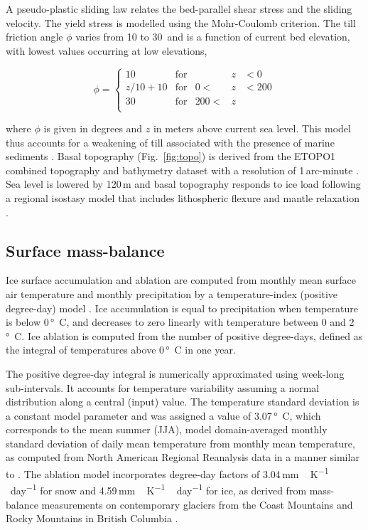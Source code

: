 A pseudo-plastic sliding law \citep{aschwanden-etal-2013} relates the bed-parallel shear stress and the sliding velocity. The yield stress is modelled using the Mohr-Coulomb criterion. The till friction angle $\phi$ varies from 10 to 30\degree\ and is a function of current bed elevation, with lowest values occurring at low elevations,

\begin{equation}
	\phi = \left\{\begin{array}{llrll}
		10      & \mathrm{for} &      &z&<  0 \\
		z/10+10 & \mathrm{for} &   0 <&z&<200 \\
		30      & \mathrm{for} & 200 <&z&     \\
	\end{array}\right.
\end{equation}

where $\phi$ is given in degrees and $z$ in meters above current sea level. This model thus accounts for a weakening of till associated with the presence of marine sediments \citep{martin-etal-2011,aschwanden-etal-2013}. Basal topography (Fig.~\ref{fig:topo}) is derived from the ETOPO1 combined topography and bathymetry dataset with a resolution of 1\,arc-minute \citep{data:etopo1}. Sea level is lowered by 120\,m and basal topography responds to ice load following a regional isostasy model that includes lithospheric flexure and mantle relaxation \citep{lingle-clark-1985}.


\subsection{Surface mass-balance}

Ice surface accumulation and ablation are computed from monthly mean surface air temperature and monthly precipitation by a temperature-index (positive degree-day) model \citep{hock-2003}. Ice accumulation is equal to precipitation when temperature is below 0\,\unit{\degree C}, and decreases to zero linearly with temperature between 0 and 2\,\unit{\degree C}. Ice ablation is computed from the number of positive degree-days, defined as the integral of temperatures above 0\,\unit{\degree C} in one year. 

The positive degree-day integral \citep{calov-greve-2005} is numerically approximated using week-long sub-intervals. It accounts for temperature variability assuming a normal distribution along a central (input) value. The temperature standard deviation is a constant model parameter and was assigned a value of 3.07\,\unit{\degree C}, which corresponds to the mean summer (JJA), model domain-averaged monthly standard deviation of daily mean temperature from monthly mean temperature, as computed from North American Regional Reanalysis data \citep{data:narr} in a manner similar to \citet{seguinot-2013}. The ablation model incorporates degree-day factors of 3.04\,\unit{mm\,K^{-1}\,day^{-1}} for snow and 4.59\,\unit{mm\,K^{-1}\,day^{-1}} for ice, as derived from mass-balance measurements on contemporary glaciers from the Coast Mountains and Rocky Mountains in British Columbia \citep{shea-etal-2009}.

